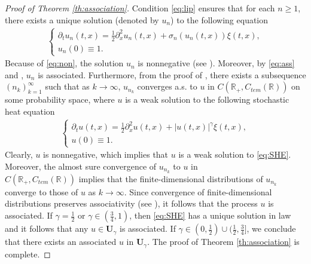 \documentclass[12pt, reqno]{amsart}
\newcommand{\R}{{\mathbb{R}}}
\newcommand{\<}{\langle}
\renewcommand{\>}{\rangle}
\begin{document}
\begin{proof}[Proof of Theorem \ref{th:association}]
Condition \eqref{eq:lip} ensures that 
for each $n\geq 1$, there exists a unique solution (denoted by $u_n$) to the following equation
 \begin{align}\label{eq:sigma_n}
\begin{cases}
\partial_tu_n(t,x)=\frac12\partial_x^2u_n(t,x)+ \sigma_n(u_n(t,x)) \xi(t,x),\\
u_n(0)\equiv1.
\end{cases}
\end{align}
Because of \eqref{eq:non}, the solution $u_n$ is nonnegative (see \cite{Mue91, Shi94}). 
Moreover, by  \eqref{eq:ass} and \cite[Theorem A.4]{CKNP23}, $u_n$ is  associated.  
Furthermore, from the proof of 
  \cite[Theorem 1.1]{MP11},  there exists a subsequence $(n_k)_{k=1}^\infty$ such that as $k\to\infty$, $u_{n_k}$ converges a.s. to $u$ in $C(\R_+, C_{tem}(\R))$ on some probability space, where $u$ is a weak solution to the following stochastic heat equation
   \begin{align*}
\begin{cases}
\partial_tu(t,x)=\frac12\partial_x^2u(t,x)+ |u(t,x)|^\gamma \xi(t,x), \\
u(0)\equiv1.
\end{cases}
\end{align*}
Clearly,  $u$ is nonnegative, which implies that $u$ is a weak solution to \eqref{eq:SHE}. 
Moreover, the almost sure convergence of $u_{n_k}$ to $u$ in\\ 
$C(\R_+, C_{tem}(\R))$ implies that the finite-dimensional 
distributions of $u_{n_k}$ converge to those of $u$ as $k\to\infty$.  
Since convergence of finite-dimensional distributions preserves 
associativity (see \cite[(P$_5$)]{EPW67}), it follows that the process $u$ 
is associated.  If $\gamma=\frac12$ or $\gamma\in (\frac34, 1)$, then \eqref{eq:SHE} has a unique solution in 
law and it follows that any $u\in \mathbf{U}_{\gamma}$ is associated. If $\gamma\in (0, \frac12)\cup(\frac12, \frac34]$, we conclude that 
there exists  an associated $u$ in $\mathbf{U}_\gamma$.
The proof of Theorem \ref{th:association} is complete. 
\end{proof}
\end{document}
